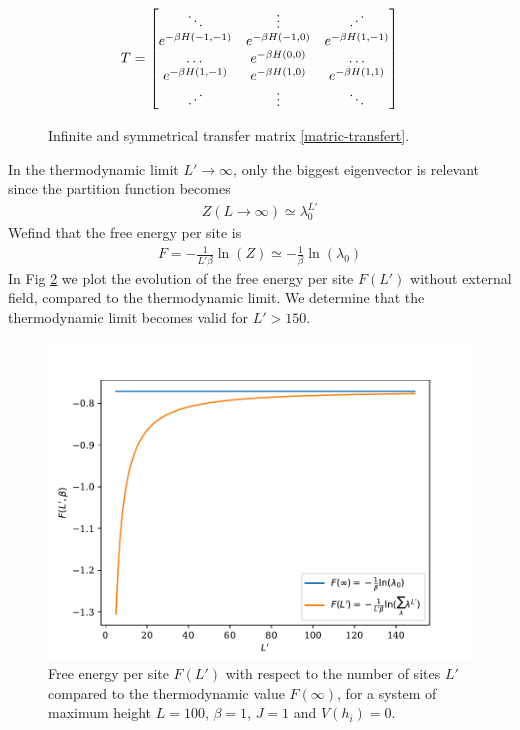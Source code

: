 {\begin{figure}
    \begin{align}
    T = \begin{bmatrix} 
            \ddots & \vdots & \reflectbox{$\ddots$} \\ 
            e^{-\beta H(-1,-1)} &  e^{-\beta H(-1,0)} & e^{-\beta H(1,-1)} \\
            \dots & e^{-\beta H(0,0)} & \dots  \\
            e^{-\beta H(1,-1)} & e^{-\beta H(1,0)} & e^{-\beta H(1,1)}   \\ 
             \reflectbox{$\ddots$} & \vdots &\ddots  \\ 
        \end{bmatrix}
    \end{align}
    \caption{Infinite and symmetrical transfer matrix \ref{matric-transfert}.}
    \label{mat-inf}
\end{figure}

In the thermodynamic limit $L' \to \infty$, only the biggest eigenvector is relevant since the partition function becomes
\begin{align}
    Z(L\to \infty) \simeq \lambda_0^{L'}
\end{align}
Wefind that the free energy per site is 
\begin{align}
	F =  - \frac{1}{L' \beta} \ln(Z) \simeq - \frac{1}{\beta } \ln( \lambda_0)
	\label{energie-libre-site}
\end{align}
In Fig \ref{fig-thermo-libre} we plot the evolution of the free energy per site $F(L')$ without external field, compared to the thermodynamic limit. We determine that the thermodynamic limit becomes valid for $L' \greater 150 $.

\begin{figure}
    \centering
	\includegraphics[width=0.7\linewidth]{int-dyn/freeene-thermo-libre.pdf}
	\caption{Free energy per site $F(L')$ with respect to the number of sites $L'$ compared to the thermodynamic value $F(\infty)$, for a system of maximum height $L=100$, $\beta=1$, $J=1$ and $V(h_i)=0$.}
	\label{fig-thermo-libre}
	\vspace{-0.5cm}
\end{figure}  

}
